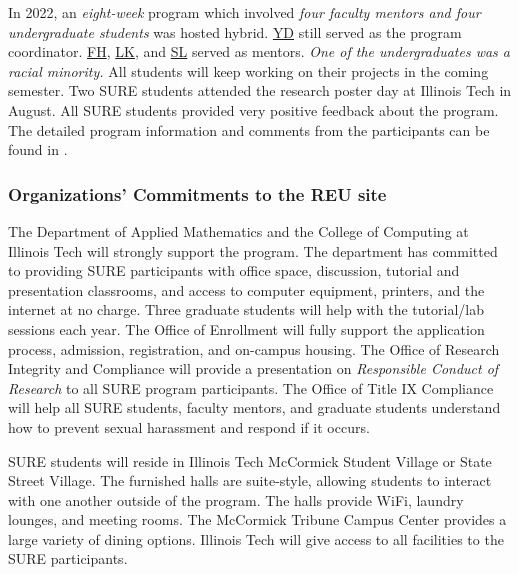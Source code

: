 \documentclass[11pt]{NSFamsart}
\newcommand{\FH}{\hyperlink{FHlink}{FH}\xspace}
\newcommand{\YD}{\hyperlink{YDlink}{YD}\xspace}
\newcommand{\LK}{\hyperlink{LKlink}{LK}\xspace}
\newcommand{\SL}{\hyperlink{SLlink}{SL}\xspace}
\begin{document}
In 2022, an \emph{eight-week} program which involved \emph{four faculty mentors and four undergraduate students} was hosted hybrid. \YD still served as the program coordinator. \FH, \LK, and \SL served as mentors. \emph{One of the undergraduates was a racial minority.} All students will keep working on their projects in the coming semester. Two SURE students attended the research poster day at Illinois Tech in August. 
All SURE students provided very positive feedback about the program. The detailed program information and comments from the participants can be found in \cite{SUREWeb}.


\subsubsection{Organizations' Commitments to the REU site}
The Department of Applied Mathematics and the College of Computing at Illinois Tech will strongly support the program. The department has committed to providing SURE participants with office space, discussion, tutorial and presentation classrooms, and access to computer equipment, printers, and the internet at no charge. Three graduate students will help with the tutorial/lab sessions each year.
The Office of Enrollment will fully support the application process, admission, registration, and on-campus housing. 
The Office of Research Integrity and Compliance will provide a presentation on \emph{Responsible Conduct of Research} to all SURE program participants. The Office of Title IX Compliance will help all SURE students, faculty mentors, and graduate students understand how to prevent sexual harassment and respond if it occurs.

SURE students
will reside in Illinois Tech McCormick Student Village or State Street Village. The furnished halls are suite-style, allowing students to interact with one another outside of the program. The halls provide WiFi, laundry
lounges, and meeting rooms. The McCormick Tribune Campus Center provides a large variety of dining options. Illinois Tech will give access to all facilities to the SURE participants. 
\end{document}
